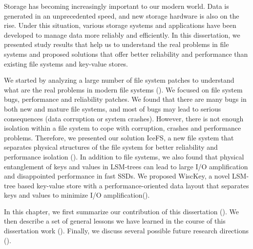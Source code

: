 
Storage has becoming increasingly important to our modern world. 
Data is generated in an unprecedented speed, and new storage hardware
is also on the rise. Under this situation, various storage 
systems and applications have been developed to manage data more
reliably and efficiently. In this dissertation, we presented study
results that help us to understand the real problems in file systems
and proposed solutions that offer better reliability and performance
than existing file systems and key-value stores. 

We started by analyzing a large number of file system patches to
understand what are the real problems in modern file systems ().  
We focused on file system bugs, performance and reliability patches. 
We found that there are many bugs in both new and mature file systems,
and most of bugs may lead to serious consequences (data corruption or
system crashes). However, there is not enough isolation within a file
system to cope with corruption, crashes and performance problems. 
Therefore, we presented our solution IceFS, a new file system that
separates physical structures of the file system for better
reliability and performance isolation ().  In
addition to file systems, we also found that physical entanglement of
keys and values in LSM-trees can lead to large I/O amplification and
disappointed performance in fast SSDs. We proposed WiscKey, a novel
LSM-tree based key-value store with a performance-oriented data layout
that separates keys and values to minimize I/O amplification(). 

In this chapter, we first summarize our contribution of this
dissertation (). We then describe a set of  
general lessons we have learned in the course of this dissertation
work (). Finally, we discuss several possible
future research directions (). 





